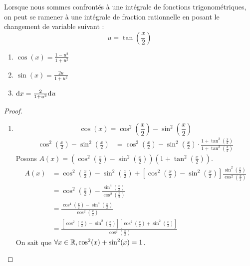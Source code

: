 Lorsque nous sommes confrontés à une intégrale de fonctions trigonométriques, on peut se ramener à une intégrale de fraction rationnelle en posant le changement de variable suivant :
\[ u = \tan(\frac{x}{2}) \]
\begin{multicols}{3}
    \begin{enumerate}
        \item $\cos(x) = \frac{1 - u^2}{1 + u^2}$
        \item $\sin(x) = \frac{2u}{1 + u^2}$
        \item $\diffd x = \frac{2}{1 + u^2} \diffd u$
    \end{enumerate}
\end{multicols}
\begin{proof}
	\leavevmode
    \begin{enumerate}
        \item \[ \cos(x) = \cos^2\left( \frac{x}{2} \right) - \sin^2\left( \frac{x}{2} \right) \]
            \begin{align*}
                \cos^2\left( \frac{x}{2} \right) - \sin^2\left( \frac{x}{2} \right) &= \cos^2\left( \frac{x}{2} \right) - \sin^2\left( \frac{x}{2} \right) \cdot \frac{1 + \tan^2 \left( \frac{x}{2} \right)}{1 + \tan^2 \left( \frac{x}{2} \right)}
            \end{align*}
            Posons $A(x) = \left( \cos^2\left( \frac{x}{2} \right) - \sin^2\left( \frac{x}{2} \right) \right) \left( 1 + \tan^2\left( \frac{x}{2} \right) \right)$.
            \begin{align*}
                A(x) &= \cos^2\left( \frac{x}{2} \right) - \sin^2\left( \frac{x}{2} \right) + \left[ \cos^2\left( \frac{x}{2} \right) - \sin^2\left( \frac{x}{2} \right) \right] \frac{\sin^2 \left( \frac{x}{2} \right)}{\cos^2 \left( \frac{x}{2} \right)} \\
                &= \cos^2 \left( \frac{x}{2} \right) - \frac{\sin^4 \left( \frac{x}{2} \right)}{\cos^2 \left( \frac{x}{2} \right)} \\
                &= \frac{\cos^4 \left( \frac{x}{2} \right) - \sin^4 \left( \frac{x}{2} \right)}{\cos^2 \left( \frac{x}{2} \right)}\\
                &= \frac{\left[ \cos^2\left( \frac{x}{2} \right) - \sin^2 \left( \frac{x}{2} \right) \right] \left[ \cos^2\left( \frac{x}{2} \right) + \sin^2 \left( \frac{x}{2} \right) \right]}{\cos^2 \left( \frac{x}{2} \right)}
            \end{align*}
             On sait que $\forall x \in \mathbb{R}, \cos^2(x) + \sin^2(x) = 1$.

\end{enumerate}
\end{proof}
